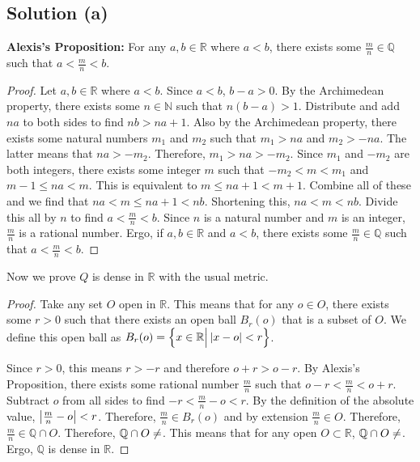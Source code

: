 \documentclass[11pt]{article}
\begin{document}
    \subsection{Solution (a)}
        \textbf{Alexis's Proposition:}
            For any $a, b \in \mathbb{R}$ where $a < b$, there exists some $\frac{m}{n} \in \mathbb{Q}$ such that $a < \frac{m}{n} < b$.
            \begin{proof}
                Let $a, b \in \mathbb{R}$ where $a < b$.
                Since $a < b$, $b - a > 0$.
                By the Archimedean property, there exists some $n \in \mathbb{N}$ such that $n(b-a)>1$.
                Distribute and add $na$ to both sides to find $nb > na + 1$.
                Also by the Archimedean property, there exists some natural numbers $m_1$ and $m_2$ such that $m_1 > na$ and $m_2 > -na$.
                The latter means that $na > -m_2$.
                Therefore, $m_1 > na > -m_2$.
                Since $m_1$ and $-m_2$ are both integers, there exists some integer $m$ such that $-m_2 < m < m_1$ and $m - 1 \leq na < m$.
                This is equivalent to $m \leq na + 1 < m + 1$.
                Combine all of these and we find that $na < m \leq na + 1 < nb$.
                Shortening this, $na < m < nb$.
                Divide this all by $n$ to find $a < \frac{m}{n} < b$.
                Since $n$ is a natural number and $m$ is an integer, $\frac{m}{n}$ is a rational number.
                Ergo, if $a, b \in \mathbb{R}$ and $a < b$, there exists some $\frac{m}{n} \in \mathbb{Q}$ such that $a < \frac{m}{n} < b$.
            \end{proof}

            Now we prove $Q$ is dense in $\mathbb{R}$ with the usual metric.
            \begin{proof}
                Take any set $O$ open in $\mathbb{R}$.
                This means that for any $o \in O$, there exists some $r > 0$ such that there exists an open ball $B_r(o)$ that is a subset of $O$.
                We define this open ball as $B_r(o) = \left\{ x \in \mathbb{R} \Big| \left| x - o \right| < r \right\}$.

                Since $r > 0$, this means $r > -r$ and therefore $o + r > o - r$.
                By Alexis's Proposition, there exists some rational number $\frac{m}{n}$ such that $o - r < \frac{m}{n} < o + r$.
                Subtract $o$ from all sides to find $-r < \frac{m}{n} - o < r$.
                By the definition of the absolute value, $\left| \frac{m}{n} - o \right| < r$.
                Therefore, $\frac{m}{n} \in B_r(o)$ and by extension $\frac{m}{n} \in O$.
                Therefore, $\frac{m}{n} \in \mathbb{Q} \cap O$.
                Therefore, $\mathbb{Q} \cap O \neq \empty$.
                This means that for any open $O \subset \mathbb{R}$, $\mathbb{Q} \cap O \neq \empty$.
                Ergo, $\mathbb{Q}$ is dense in $\mathbb{R}$.
            \end{proof}
\end{document}
